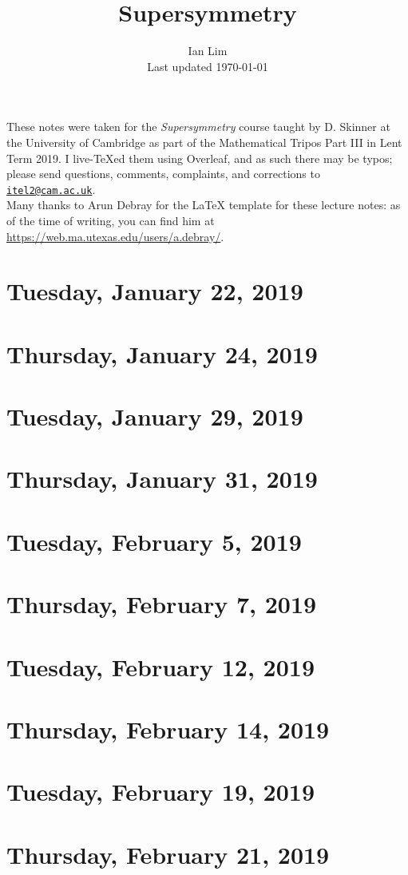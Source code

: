 \documentclass[reqno]{amsart}
\begin{document}
\title{Supersymmetry}
\author{Ian Lim\\ Last updated \today}
\maketitle
{\small\noindent These notes were taken for the \textit{Supersymmetry} course taught by D. Skinner at the University of Cambridge as part of the Mathematical Tripos Part III in Lent Term 2019. I live-\TeX ed them using Overleaf, and as such there may be typos; please send questions, comments, complaints, and corrections to 
\href{mailto:itel2@cam.ac.uk?subject=SUSY\%20Lecture\%20Notes}{\texttt{itel2@cam.ac.uk}}.\\
Many thanks to Arun Debray for the {\LaTeX} template for these lecture notes: as of the time of writing, you can find him at \url{https://web.ma.utexas.edu/users/a.debray/}.}

\tableofcontents

\section{Tuesday, January 22, 2019}
    

\section{Thursday, January 24, 2019}
    

\section{Tuesday, January 29, 2019}
    

\section{Thursday, January 31, 2019}
    

\section{Tuesday, February 5, 2019}
    

\section{Thursday, February 7, 2019}
    

\section{Tuesday, February 12, 2019}
    

\section{Thursday, February 14, 2019}
    

\section{Tuesday, February 19, 2019}
    
    
\section{Thursday, February 21, 2019}
    
\end{document}
